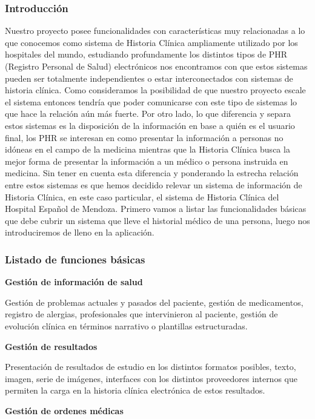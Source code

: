 {\correccionTexto
\subsubsection{Introducción}
Nuestro proyecto posee funcionalidades con características muy relacionadas a lo que conocemos como sistema de Historia Clínica ampliamente utilizado por los hospitales del mundo, estudiando profundamente los distintos tipos de PHR (Registro Personal de Salud) electrónicos nos encontramos con que estos sistemas pueden ser totalmente independientes o estar interconectados con sistemas de historia clínica. Como consideramos la posibilidad de que nuestro proyecto escale el sistema entonces tendría que poder comunicarse con este tipo de sistemas lo que hace la relación aún más fuerte. Por otro lado, lo que diferencia y separa estos sistemas es la disposición de la información en base a quién es el usuario final, los PHR se interesan en como presentar la información a personas no idóneas en el campo de la medicina mientras que la Historia Clínica busca la mejor forma de presentar la información a un médico o persona instruida en medicina. Sin tener en cuenta esta diferencia y ponderando la estrecha relación entre estos sistemas es que hemos decidido relevar un sistema de información de Historia Clínica, en este caso particular, el sistema de Historia Clínica del Hospital Español de Mendoza.
Primero vamos a listar las funcionalidades básicas que debe cubrir un sistema que lleve el historial médico de una persona, luego nos introduciremos de lleno en la aplicación.
}

\subsubsection{Listado de funciones básicas}

\textbf{Gestión de información de salud}

Gestión de problemas actuales y pasados del paciente, gestión de medicamentos, registro de alergias, profesionales que intervinieron al paciente, gestión de evolución clínica en términos narrativo o plantillas estructuradas.

\textbf{Gestión de resultados}

Presentación de resultados de estudio en los distintos formatos posibles, texto, imagen, serie de imágenes, interfaces con los distintos proveedores internos que permiten la carga en la historia clínica electrónica de estos resultados.

\textbf{Gestión de ordenes médicas}

